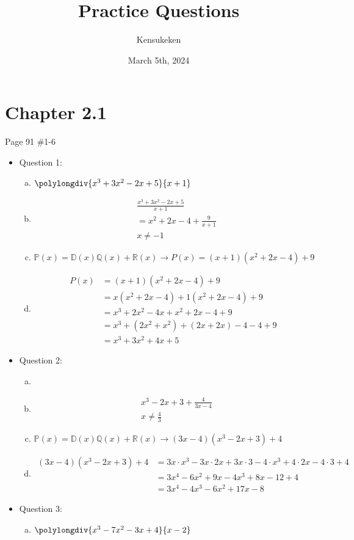 \documentclass{article}
\title{Practice Questions}
\author{Kensukeken}
\date{March 5th, 2024}
\begin{document}
\maketitle
\section*{Chapter 2.1}
Page 91 \#1-6
\begin{itemize}
\item Question 1:
\begin{enumerate}[a)]
    \item \(\polylongdiv{x^3 + 3x^2 - 2x + 5}{x + 1}\)
    
    \item \begin{align*}
        &\frac{x^3 + 3x^2 - 2x + 5}{x + 1}\\
        &=x^2+2x-4+\frac{9}{x + 1}\\
        &\boxed{x \neq -1}
    \end{align*}
    
    \item \(\mathbb{P}(x)=\mathbb{D}(x)\mathbb{Q}(x)+\mathbb{R}(x)\longrightarrow P(x)=(x+1)(x^2+2x-4)+9\)
    
    \item \begin{align*}
        P(x) &= (x+1)(x^2 + 2x - 4) + 9 \\
        &= x(x^2 + 2x - 4) + 1(x^2 + 2x - 4) + 9 \\
        &= x^3 + 2x^2 - 4x + x^2 + 2x - 4 + 9 \\
        &= x^3 + (2x^2 + x^2) + (2x + 2x) - 4 - 4 + 9 \\
        &= x^3 + 3x^2 + 4x + 5
    \end{align*}
\end{enumerate}
\newpage
\item Question 2:
\begin{enumerate}[a)]
\item {}
\item \begin{align*}
    &x^3-2x+3+\frac{4}{3x-4}\\
    &\boxed{x \neq \frac{4}{3}}
\end{align*}
\item $\mathbb{P}(x)=\mathbb{D}(x)\mathbb{Q}(x)+\mathbb{R}(x) \longrightarrow (3x-4)(x^3-2x+3)+4$
\item \begin{align*}
(3x-4)(x^3-2x+3)+4 &= 3x \cdot x^3 - 3x \cdot 2x + 3x \cdot 3 - 4 \cdot x^3 + 4 \cdot 2x - 4 \cdot 3 + 4 \\
&= 3x^4 - 6x^2 + 9x - 4x^3 + 8x - 12 + 4 \\
&= 3x^4 - 4x^3 - 6x^2 + 17x - 8
\end{align*}
\end{enumerate}
\item Question 3:
\begin{enumerate}[a)]
    \item \(\polylongdiv{x^3 - 7x^2 - 3x + 4}{x - 2}\)
    

\end{enumerate}
\end{itemize}
\end{document}
